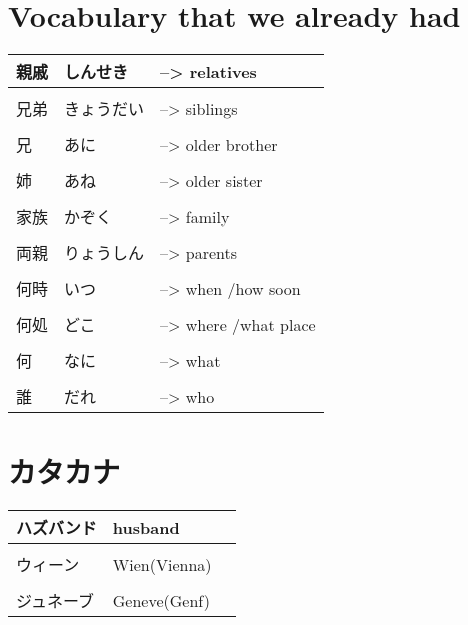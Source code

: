 \documentclass{article}
\begin{document}
\newpage
\part*{Vocabulary that we already had}
\begin{tabular}{ p{3cm} | l l }
親戚&しんせき&--> relatives \\ \hline\\[-1em]
兄弟&きょうだい&--> siblings \\ \hline\\[-1em]
兄&あに&--> older brother \\ \hline\\[-1em]
姉&あね&--> older sister \\ \hline\\[-1em]
家族&かぞく&--> family \\ \hline\\[-1em]
両親&りょうしん&--> parents \\ \hline\\[-1em]
何時&いつ&--> when /how soon \\ \hline\\[-1em]
何処&どこ&--> where /what place \\ \hline\\[-1em]
何&なに&--> what \\ \hline\\[-1em]
誰&だれ&--> who %
\end{tabular}

\part*{カタカナ}
\begin{tabular}{ p{3cm} | l l }
ハズバンド&husband \\ \hline\\[-1em]
ウィーン&Wien(Vienna) \\ \hline\\[-1em]
ジュネーブ&Geneve(Genf)
\end{tabular}
\end{document}
